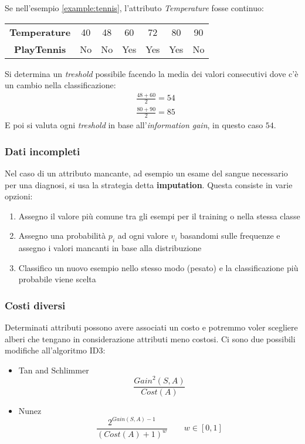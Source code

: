 \begin{example}
	Se nell'esempio \ref{example:tennis}, l'attributo \textit{Temperature} fosse continuo:
	\begin{table}[H]
		\centering
		\begin{tabular}{|c|cccccc|}
			\hline
			\textbf{Temperature} & 40 & 48 & 60 & 72 & 80 & 90 \\
			\textbf{PlayTennis} & No & No & Yes & Yes & Yes & No \\
			\hline
		\end{tabular}
	\end{table}
	Si determina un \textit{treshold} possibile facendo la media dei valori consecutivi dove c'è un cambio nella classificazione:
	\begin{align*}
		& \frac{48+60}{2} = 54\\
		& \frac{80+90}{2} = 85
	\end{align*}
	E poi si valuta ogni \textit{treshold} in base all'\textit{information gain}, in questo caso $54$.
\end{example}
\subsubsection{Dati incompleti}
Nel caso di un attributo mancante, ad esempio un esame del sangue necessario per una diagnosi, si usa la strategia detta \textbf{imputation}. Questa consiste in varie opzioni:
\begin{enumerate}
	\item Assegno il valore più comune tra gli esempi per il training o nella stessa classe
	\item Assegno una probabilità $p_i$ ad ogni valore $v_i$ basandomi sulle frequenze e assegno i valori mancanti in base alla distribuzione
	\item Classifico un nuovo esempio nello stesso modo (pesato) e la classificazione più probabile viene scelta
\end{enumerate}
\subsubsection{Costi diversi}
Determinati attributi possono avere associati un costo e potremmo voler scegliere alberi che tengano in considerazione attributi meno costosi. Ci sono due possibili modifiche all'algoritmo ID3:
\begin{itemize}
	\item Tan and Schlimmer
	\begin{equation*}
		\frac{Gain^2(S,A)}{Cost(A)}
	\end{equation*}
	\item Nunez
	\begin{equation*}
		\frac{2^{Gain(S,A)-1}}{(Cost(A)+1)^w} \quad\quad w \in [0,1]
	\end{equation*}
\end{itemize}

